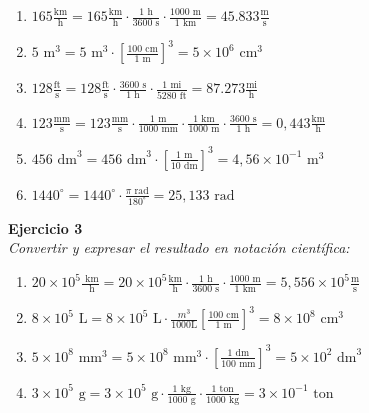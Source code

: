 \documentclass[letterpaper, 12pt, a4paper]{report}
\begin{document}
\begin{flushleft}
\begin{enumerate}
    \begin{enumerate}
    \item $165\frac{\text{km}}{\text{h}} = 165\frac{\text{km}}{\text{h}} \cdot \frac{1\text{ h}}{3600\text{ s}}\cdot \frac{1000\text{ m}}{1\text{ km}}=45.833\frac{\text{m}}{\text{s}}$
    \item $5\text{ m}^{3} = 5\text{ m}^{3}\cdot \left [\frac{100\text{ cm}}{1\text{ m}} \right ]^3 =5\times10^{6}\text{ cm}^3 $
    \item $128\frac{\text{ft}}{\text{s}} = 128\frac{\text{ft}}{\text{s}}\cdot \frac{3600\text{ s}}{1\text{ h}}\cdot \frac{1\text{ mi}}{5280\text{ ft}} =87.273\frac{\text{mi}}{\text{h}} $
    \item $123\frac{\text{mm}}{\text{s}} = 123\frac{\text{mm}}{\text{s}} \cdot \frac{1\text{ m}}{1000\text{ mm}}\cdot \frac{1\text{ km}}{1000\text{ m}}\cdot \frac{3600\text{ s}}{1\text{ h}} =0,443\frac{\text{km}}{\text{h}} $
    \item $456\text{ dm}^{3} = 456\text{ dm}^{3}\cdot \left [\frac{1\text{ m}}{10\text{ dm}} \right ]^3 =4,56\times10^{-1}\text{ m}^3 $
    \item $1440^\circ = 1440^\circ\cdot \frac{\pi \text { rad}}{180^\circ} =25,133\text{ rad}$
    \end{enumerate}
    \end{enumerate}
\vspace{1cm}
\textbf{Ejercicio 3}\\
\vspace{0.5cm}
\textit{Convertir y expresar el resultado en notación científica:}
\begin{enumerate}
    \begin{enumerate}
        \item $20 \times 10^{5} \frac{\text{ km}}{\text{ h}} = 20 \times 10^{5}\frac{\text{km}}{\text{h}} \cdot \frac{1\text{ h}}{3600\text{ s}}\cdot \frac{1000\text{ m}}{1\text{ km}}=5,556 \times 10^{5}\frac{\text{m}}{\text{s}} $
        \item $8 \times 10^{5}\text{ L} = 8 \times 10^{5}\text{ L}\cdot \frac{m^{3}}{\text{1000L}}  \left [\frac{100\text{ cm}}{1\text{ m}} \right ]^3 =8\times10^{8}\text{ cm}^3 $
        \item $5 \times 10^{8}\text{ mm}^{3} = 5 \times 10^{8}\text{ mm}^{3}\cdot \left [\frac{1\text{ dm}}{100\text{ mm}} \right ]^3 =5\times10^{2}\text{ dm}^3 $
    \item $3\times 10^{5}\text{ g} = 3\times 10^{5}\text{ g} \cdot \frac{1\text{ kg}}{1000\text{ g}}\cdot \frac{1\text{ ton}}{1000\text{ kg}} =3\times 10^{-1}\text{ ton} $

\end{enumerate}
\end{enumerate}
\end{flushleft}
\end{document}
